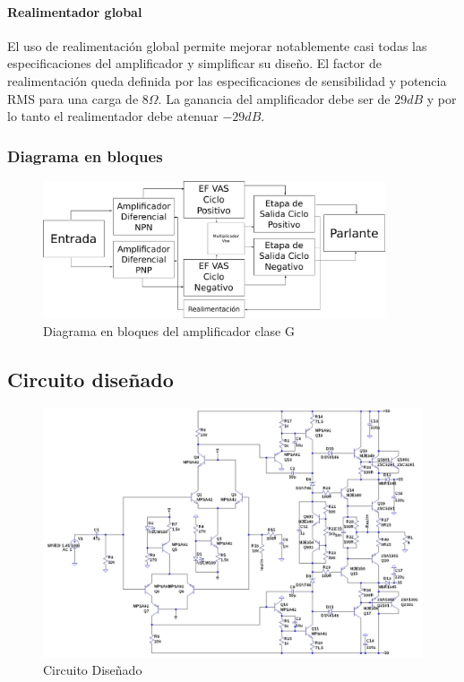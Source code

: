 \documentclass[a4paper,12pt,twoside]{article}
\begin{document}
\paragraph{Realimentador global}

El uso de realimentación global permite mejorar notablemente casi todas las especificaciones del amplificador y simplificar su diseño. El factor de realimentación queda definida por las especificaciones de sensibilidad y potencia RMS para una carga de $8\Omega$. La ganancia del amplificador debe ser de $29dB$ y por lo tanto el realimentador debe atenuar $-29dB$.



\subsubsection{Diagrama en bloques}



\begin{figure}[H]
	\centering
	\includegraphics[width=0.9\textwidth]{img/bloques}
	\caption{Diagrama en bloques del amplificador clase G}
	\label{fig:ampli_bloques}
\end{figure}

\newpage


\subsection{Circuito diseñado}


\begin{figure}[H]
\includegraphics[width=0.75\paperheight,angle=90,origin=c]{img/circuito}
\caption{Circuito Diseñado}
\label{fig:circuito} 
\end{figure}
\end{document}
